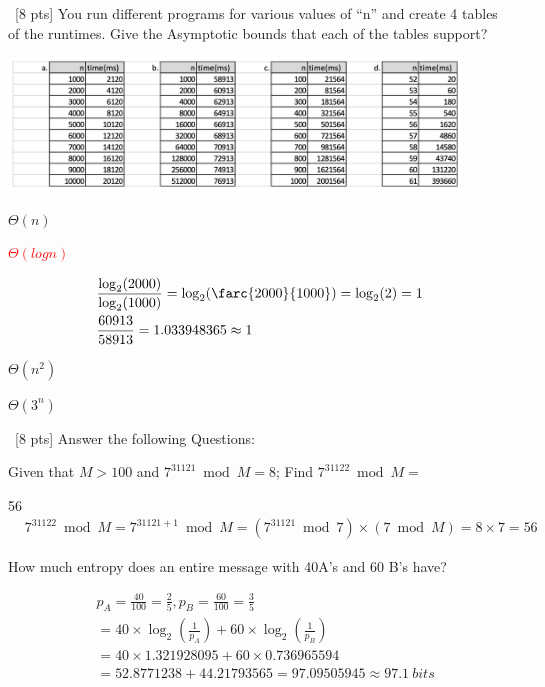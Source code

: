 \documentclass[12pt]{article}
\newenvironment{sol}[1][Solution]{\begin{trivlist}\item[\hskip\labelsep {\bfseries #1:}]}{\end{trivlist}}
\begin{document}
\begin{enumerate}
\begin{sol}
    \end{sol}

    \item \ [8 pts] You run different programs for various values of “n” and create 4 tables of the runtimes. Give the Asymptotic bounds that each of the tables support?
        \begin{center}
            \includegraphics[width = 0.9\textwidth]{p2.png}
        \end{center}
        \begin{enumerate}
            \item $\Theta(n)$
            \item \textcolor{red}{$\Theta(logn)$}
            \begin{sol}
            \begin{align*}
                & \frac{\log_2(2000)}{\log_2(1000)} = \log_2(\farc{2000}{1000}) = \log_2(2) =1 \\
                & \frac{60913}{58913} = 1.033948365 \approx 1 
            \end{align*}
            \end{sol}
            \item $\Theta(n^2)$
            \item $\Theta(3^n)$
        \end{enumerate}


    \item \ [8 pts] Answer the following Questions:
    \begin{enumerate}
        \item Given that $M > 100 $ and $7^{31121} \bmod M = 8$; Find $7^{31122} \bmod M = $
        \begin{sol}
        56
        \begin{align*}
            & 7^{31122} \bmod M = 7^{31121+1} \bmod M = (7^{31121} \bmod 7) \times (7 \bmod M) = 8 \times 7 = 56
        \end{align*}
        \end{sol}

        \item How much entropy does an entire message with 40A’s and 60 B’s have?
        \begin{sol}
        \begin{align*}
            & p_A = \frac{40}{100}= \frac{2}{5}, p_B = \frac{60}{100} = \frac{3}{5} \\
            & = 40 \times \log_2(\frac{1}{p_A}) + 60 \times \log_2(\frac{1}{p_B})\\
            & = 40 \times 1.321928095 + 60 \times 0.736965594 \\
            & = 52.8771238+44.21793565 = 97.09505945 \approx 97.1 \ bits
        \end{align*}
        \end{sol}


\end{enumerate}
\end{enumerate}
\end{document}
